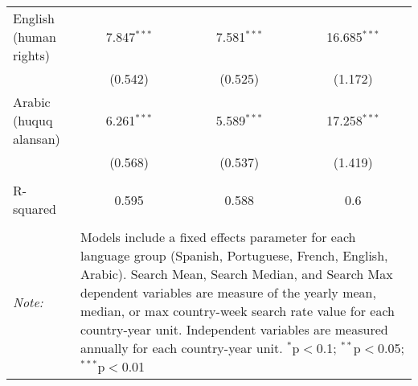 \begin{table}[!htbp]
\begin{tabular}{@{\extracolsep{5pt}}lccc}
  English (human rights) & 7.847$^{***}$ & 7.581$^{***}$ & 16.685$^{***}$ \\ 
  & (0.542) & (0.525) & (1.172) \\ 
  Arabic (huquq alansan) & 6.261$^{***}$ & 5.589$^{***}$ & 17.258$^{***}$ \\ 
  & (0.568) & (0.537) & (1.419) \\ 
 \hline \\[-1.8ex] 
R-squared  & 0.595 & 0.588 & 0.6 \\ 
\hline 
\hline \\[-1.8ex] 
\textit{Note:}  & \multicolumn{3}{l}{\parbox[t]{8cm}{Models include a fixed effects parameter for each language group (Spanish, Portuguese, French, English, Arabic). Search Mean, Search Median, and Search Max dependent variables are measure of the yearly mean, median, or max country-week search rate value for each country-year unit. Independent variables are measured annually for each country-year unit. $^{*}$p$<$0.1; $^{**}$p$<$0.05; $^{***}$p$<$0.01}} \\ 
\end{tabular} 
\end{table} 
